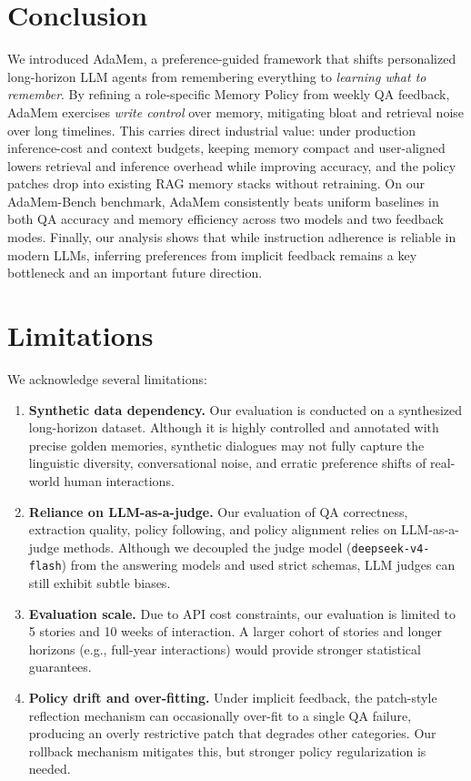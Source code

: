 \documentclass[11pt]{article}
\begin{document}
\section{Conclusion}
We introduced AdaMem, a preference-guided framework that shifts personalized long-horizon LLM agents from remembering everything to \emph{learning what to remember}. By refining a role-specific Memory Policy from weekly QA feedback, AdaMem exercises \emph{write control} over memory, mitigating bloat and retrieval noise over long timelines. This carries direct industrial value: under production inference-cost and context budgets, keeping memory compact and user-aligned lowers retrieval and inference overhead while improving accuracy, and the policy patches drop into existing RAG memory stacks without retraining. On our AdaMem-Bench benchmark, AdaMem consistently beats uniform baselines in both QA accuracy and memory efficiency across two models and two feedback modes. Finally, our analysis shows that while instruction adherence is reliable in modern LLMs, inferring preferences from implicit feedback remains a key bottleneck and an important future direction.

\section{Limitations}
We acknowledge several limitations:
\begin{enumerate}
    \item \textbf{Synthetic data dependency.} Our evaluation is conducted on a synthesized long-horizon dataset. Although it is highly controlled and annotated with precise golden memories, synthetic dialogues may not fully capture the linguistic diversity, conversational noise, and erratic preference shifts of real-world human interactions.
    \item \textbf{Reliance on LLM-as-a-judge.} Our evaluation of QA correctness, extraction quality, policy following, and policy alignment relies on LLM-as-a-judge methods. Although we decoupled the judge model (\texttt{deepseek-v4-flash}) from the answering models and used strict schemas, LLM judges can still exhibit subtle biases.
    \item \textbf{Evaluation scale.} Due to API cost constraints, our evaluation is limited to 5 stories and 10 weeks of interaction. A larger cohort of stories and longer horizons (e.g., full-year interactions) would provide stronger statistical guarantees.
    \item \textbf{Policy drift and over-fitting.} Under implicit feedback, the patch-style reflection mechanism can occasionally over-fit to a single QA failure, producing an overly restrictive patch that degrades other categories. Our rollback mechanism mitigates this, but stronger policy regularization is needed.
\end{enumerate}


\end{document}
